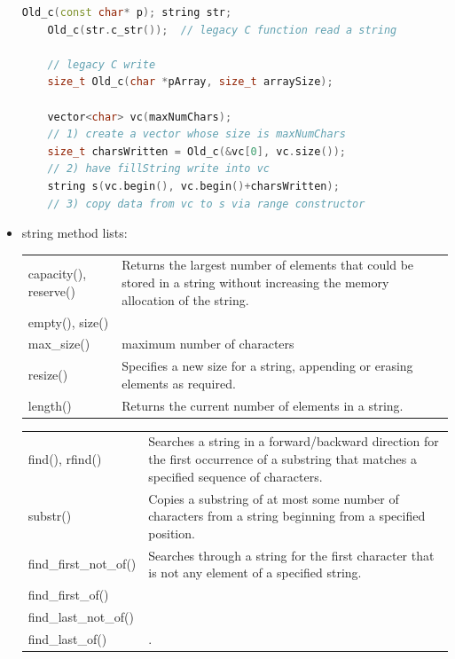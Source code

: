 \documentclass[a4paper,11pt,twoside]{book}
\renewcommand{\hline}{}
\begin{document}
\begin{itemize}
	\begin{lstlisting}[frame=single, language=c++]
	Old_c(const char* p); string str;
	Old_c(str.c_str());  // legacy C function read a string
	
	// legacy C write
	size_t Old_c(char *pArray, size_t arraySize);
	
	vector<char> vc(maxNumChars);
	// 1) create a vector whose size is maxNumChars
	size_t charsWritten = Old_c(&vc[0], vc.size());
	// 2) have fillString write into vc
	string s(vc.begin(), vc.begin()+charsWritten);
	// 3) copy data from vc to s via range constructor
	\end{lstlisting}
	
	\item string method lists:
	
	\begin{tabular}{| p{} |p{}|}
		\hline
		capacity(), reserve() & Returns the largest number of elements that could be stored in a string without increasing the memory allocation of the string.\\
		\hline
		empty(),  size()& \\
		\hline
		max\_size() & maximum number of characters \\
		resize() & Specifies a new size for a string, appending or erasing elements as required.\\
		\hline
		length() & Returns the current number of elements in a string.\\
		\hline
		
	\end{tabular}
	
	\begin{tabular}{| p{} |p{}|}
		\hline
		find(), rfind() & Searches a string in a forward/backward direction for the first occurrence of a substring that matches a specified sequence of characters.\\
		\hline
		substr() & Copies a substring of at most some number of characters from a string beginning from a specified position. \\
		
		\hline
		find\_first\_not\_of() & Searches through a string for the first character that is not any element of a specified string.\\
		\hline
		find\_first\_of() & \\
		\hline
		find\_last\_not\_of() & \\
		\hline
		find\_last\_of() & .\\
		\hline
	\end{tabular}
	

\end{itemize}
\end{document}
